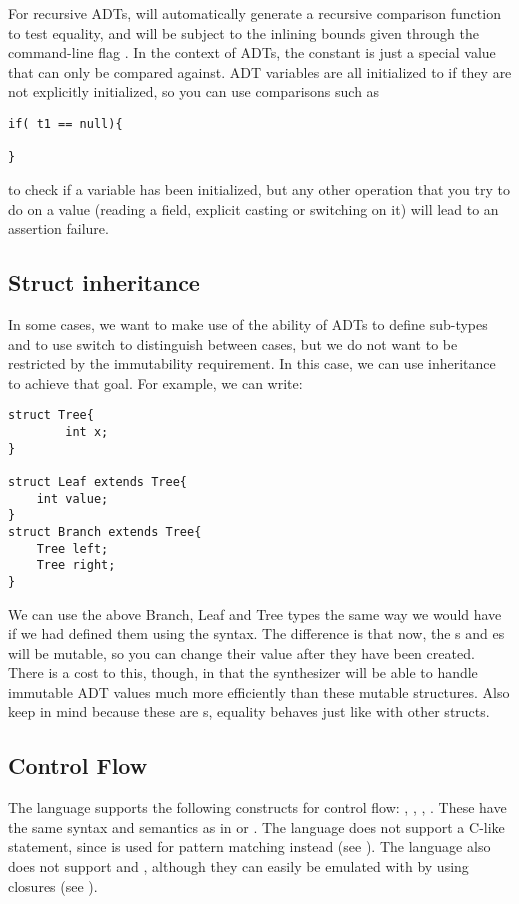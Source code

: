 For recursive ADTs, \Sk{} will automatically generate a recursive comparison function to test equality, and will be subject to the inlining bounds given through the command-line flag . 
In the context of ADTs, the constant  is just a special value that can only be compared against. ADT variables are all initialized to  if they are not explicitly initialized, so you can use comparisons such as 
\begin{lstlisting}
if( t1 == null){

}
\end{lstlisting}
to check if a variable has been initialized, but any other operation that you try to do on a  value (reading a field, explicit casting or switching on it) will lead to an assertion failure.

\subsection{Struct inheritance}
In some cases, we want to make use of the ability of ADTs to define sub-types and to use switch to distinguish between cases, but we do not want to be restricted by the immutability requirement. In this case, we can use  inheritance to achieve that goal. For example, we can write: 
\begin{lstlisting}
struct Tree{
        int x;
}

struct Leaf extends Tree{
    int value;
}
struct Branch extends Tree{
    Tree left;
    Tree right;
}
\end{lstlisting}

We can use the above Branch, Leaf and Tree types the same way we would have if we had defined them using the  syntax. The difference is that now, the s and es will be mutable, so you can change their value after they have been created. There is a cost to this, though, in that the synthesizer will be able to handle immutable ADT values much more efficiently than these mutable structures. Also keep in mind because these are s, equality behaves just like with other structs.



\subsection{Control Flow}
The language supports the following constructs for control flow: , , , . These have the same syntax and semantics as in  or . The language does not support a C-like  statement, since  is used for pattern matching instead (see ). The language also does not support  and , although they can easily be emulated with  by using closures (see ).

